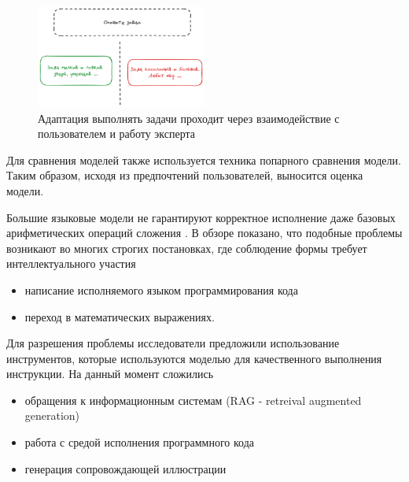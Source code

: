 \begin{figure}[h]
    \centering
    \includegraphics[width=0.5\textwidth]{assets/work/arch/instruction.excalidraw.png}
    \caption{Адаптация выполнять задачи проходит через взаимодействие с пользователем и работу эксперта}
    \label{instruction}
\end{figure}

Для сравнения моделей также используется техника попарного сравнения модели. 
Таким образом, исходя из предпочтений пользователей, выносится оценка модели.

Большие языковые модели не гарантируют корректное исполнение даже базовых арифметических операций сложения . 
В обзоре \cite{zhao2023survey} показано, что подобные проблемы возникают во многих строгих постановках, где
соблюдение формы требует интеллектуального участия \begin{itemize}
    \item написание исполняемого языком программирования кода
    \item переход в математических выражениях.
\end{itemize} 

Для разрешения проблемы исследователи предложили использование инструментов,
которые используются моделью для качественного выполнения инструкции. На данный момент сложились \begin{itemize}
    \item обращения к информационным системам  (RAG - retreival augmented generation)\cite{lewis2020retrieval}
    \item работа с средой исполнения программного кода \cite{parisi2022talm}
    \item генерация сопровождающей иллюстрации \cite{rombach2022high}
\end{itemize}










